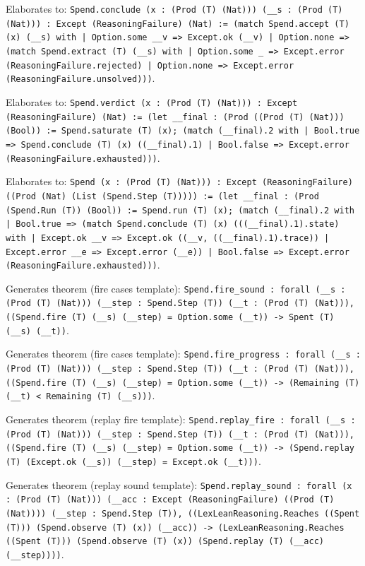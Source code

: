 \documentclass[11pt]{article}
\begin{document}
\noindent Elaborates to: \texttt{Spend.conclude (x : (Prod (T) (Nat))) (\_\_s : (Prod (T) (Nat))) : Except (ReasoningFailure) (Nat) := (match Spend.accept (T) (x) (\_\_s) with | Option.some \_\_v => Except.ok (\_\_v) | Option.none => (match Spend.extract (T) (\_\_s) with | Option.some \_ => Except.error (ReasoningFailure.rejected) | Option.none => Except.error (ReasoningFailure.unsolved)))}.\par
\noindent Elaborates to: \texttt{Spend.verdict (x : (Prod (T) (Nat))) : Except (ReasoningFailure) (Nat) := (let \_\_final : (Prod ((Prod (T) (Nat))) (Bool)) := Spend.saturate (T) (x); (match (\_\_final).2 with | Bool.true => Spend.conclude (T) (x) ((\_\_final).1) | Bool.false => Except.error (ReasoningFailure.exhausted)))}.\par
\noindent Elaborates to: \texttt{Spend (x : (Prod (T) (Nat))) : Except (ReasoningFailure) ((Prod (Nat) (List (Spend.Step (T))))) := (let \_\_final : (Prod (Spend.Run (T)) (Bool)) := Spend.run (T) (x); (match (\_\_final).2 with | Bool.true => (match Spend.conclude (T) (x) (((\_\_final).1).state) with | Except.ok \_\_v => Except.ok ((\_\_v, ((\_\_final).1).trace)) | Except.error \_\_e => Except.error (\_\_e)) | Bool.false => Except.error (ReasoningFailure.exhausted)))}.\par
\noindent Generates theorem (fire cases template): \texttt{Spend.fire\_sound : forall (\_\_s : (Prod (T) (Nat))) (\_\_step : Spend.Step (T)) (\_\_t : (Prod (T) (Nat))), ((Spend.fire (T) (\_\_s) (\_\_step) = Option.some (\_\_t)) -> Spent (T) (\_\_s) (\_\_t))}.\par
\noindent Generates theorem (fire cases template): \texttt{Spend.fire\_progress : forall (\_\_s : (Prod (T) (Nat))) (\_\_step : Spend.Step (T)) (\_\_t : (Prod (T) (Nat))), ((Spend.fire (T) (\_\_s) (\_\_step) = Option.some (\_\_t)) -> (Remaining (T) (\_\_t) < Remaining (T) (\_\_s)))}.\par
\noindent Generates theorem (replay fire template): \texttt{Spend.replay\_fire : forall (\_\_s : (Prod (T) (Nat))) (\_\_step : Spend.Step (T)) (\_\_t : (Prod (T) (Nat))), ((Spend.fire (T) (\_\_s) (\_\_step) = Option.some (\_\_t)) -> (Spend.replay (T) (Except.ok (\_\_s)) (\_\_step) = Except.ok (\_\_t)))}.\par
\noindent Generates theorem (replay sound template): \texttt{Spend.replay\_sound : forall (x : (Prod (T) (Nat))) (\_\_acc : Except (ReasoningFailure) ((Prod (T) (Nat)))) (\_\_step : Spend.Step (T)), ((LexLeanReasoning.Reaches ((Spent (T))) (Spend.observe (T) (x)) (\_\_acc)) -> (LexLeanReasoning.Reaches ((Spent (T))) (Spend.observe (T) (x)) (Spend.replay (T) (\_\_acc) (\_\_step))))}.\par
\end{document}
